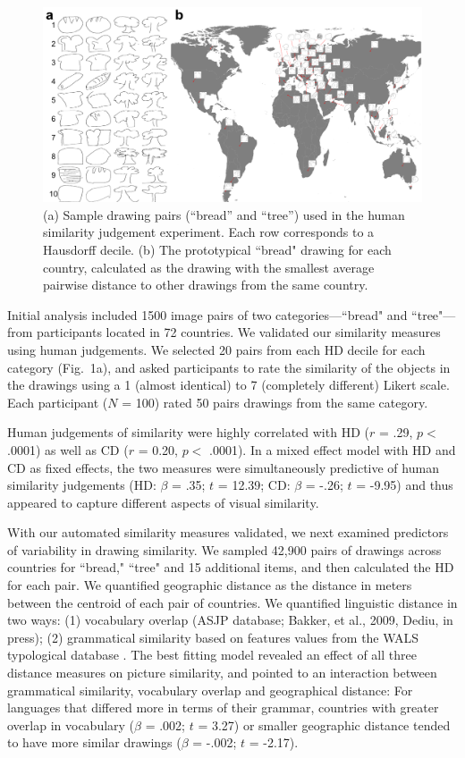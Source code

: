 \documentclass{evolang12}
\begin{document}
\begin{figure}[t]
\includegraphics[width=4.55in]{full_fig3.png}
\caption{(a) Sample drawing pairs (``bread'' and ``tree'') used in the human similarity judgement experiment. Each row corresponds to a Hausdorff decile. (b) The prototypical ``bread" drawing for each country, calculated as the drawing with the smallest average pairwise distance to other drawings from the same country. \label{fig1}}
\end{figure}

Initial analysis included 1500 image pairs of two categories---``bread" and ``tree"---from participants located in 72 countries. We validated our similarity measures using human judgements. We selected 20 pairs from each HD decile for each category (Fig.\ 1a), and asked participants to rate the similarity of the objects in the drawings using a 1 (almost identical) to 7 (completely different) Likert scale. Each participant ($N$ = 100) rated 50 pairs drawings from the same category. 

Human judgements of similarity were highly correlated with HD ($r$ = .29, $p <$ .0001) as well as CD ($r$ = 0.20, $p <$ .0001). In a mixed effect model with HD and CD as fixed effects, the two measures were simultaneously predictive of human similarity judgements (HD: $\beta$ = .35; $t$ = 12.39; CD: $\beta$ = -.26; $t$ = -9.95) and thus appeared to capture different aspects of visual similarity.

With our automated similarity measures validated, we next examined predictors of variability in drawing similarity. We sampled 42,900 pairs of drawings across countries for ``bread," ``tree" and 15 additional items, and then calculated the HD for each pair. We quantified geographic distance as the distance in meters between the centroid of each pair of countries. We quantified linguistic distance in two ways: (1) vocabulary overlap (ASJP database; Bakker, et al., 2009, Dediu, in press); (2) grammatical similarity based on features values from the WALS typological database \cite{dediu}. The best fitting model revealed an effect of all three distance measures on picture similarity, and pointed to an interaction between grammatical similarity, vocabulary overlap and geographical distance: For languages that differed more in terms of their grammar, countries with greater overlap in vocabulary ($\beta$ = .002; $t$ = 3.27) or smaller geographic distance tended to have more similar drawings ($\beta$ = -.002; $t$ = -2.17).
\end{document}
